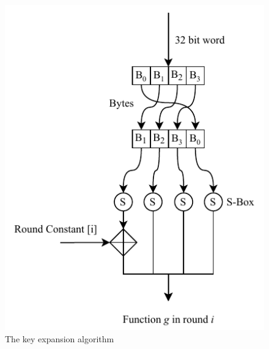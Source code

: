 \begin{figure}
\begin{minipage}{.35\textwidth}
    \includegraphics[width=\linewidth]{data/assets/g_function.pdf}
  \end{minipage}
  \caption{The key expansion algorithm \cite{paar}}
  \label{fig:keyexpansion}
\end{figure}
